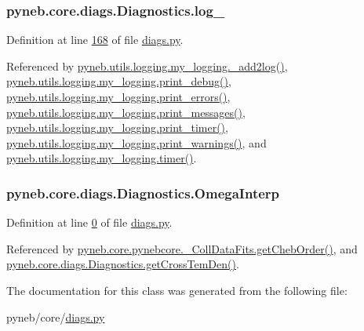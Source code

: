 \hypertarget{classpyneb_1_1core_1_1diags_1_1_diagnostics_a20b70abfa1fd458af2b797e06da01ed0}{}
\subsubsection[{log\+\_\+}]{\setlength{\rightskip}{0pt plus 5cm}pyneb.\+core.\+diags.\+Diagnostics.\+log\+\_\+}\label{classpyneb_1_1core_1_1diags_1_1_diagnostics_a20b70abfa1fd458af2b797e06da01ed0}


Definition at line \hyperlink{diags_8py_source_l00168}{168} of file \hyperlink{diags_8py_source}{diags.\+py}.



Referenced by \hyperlink{logging_8py_source_l00059}{pyneb.\+utils.\+logging.\+my\+\_\+logging.\+\_\+add2log()}, \hyperlink{logging_8py_source_l00157}{pyneb.\+utils.\+logging.\+my\+\_\+logging.\+print\+\_\+debug()}, \hyperlink{logging_8py_source_l00149}{pyneb.\+utils.\+logging.\+my\+\_\+logging.\+print\+\_\+errors()}, \hyperlink{logging_8py_source_l00133}{pyneb.\+utils.\+logging.\+my\+\_\+logging.\+print\+\_\+messages()}, \hyperlink{logging_8py_source_l00165}{pyneb.\+utils.\+logging.\+my\+\_\+logging.\+print\+\_\+timer()}, \hyperlink{logging_8py_source_l00141}{pyneb.\+utils.\+logging.\+my\+\_\+logging.\+print\+\_\+warnings()}, and \hyperlink{logging_8py_source_l00115}{pyneb.\+utils.\+logging.\+my\+\_\+logging.\+timer()}.

\hypertarget{classpyneb_1_1core_1_1diags_1_1_diagnostics_acfd0638b293790832bcee3cd9f3ec342}{}
\subsubsection[{Omega\+Interp}]{\setlength{\rightskip}{0pt plus 5cm}pyneb.\+core.\+diags.\+Diagnostics.\+Omega\+Interp}\label{classpyneb_1_1core_1_1diags_1_1_diagnostics_acfd0638b293790832bcee3cd9f3ec342}


Definition at line \hyperlink{diags_8py_source_l00000}{0} of file \hyperlink{diags_8py_source}{diags.\+py}.



Referenced by \hyperlink{pynebcore_8py_source_l00694}{pyneb.\+core.\+pynebcore.\+\_\+\+Coll\+Data\+Fits.\+get\+Cheb\+Order()}, and \hyperlink{diags_8py_source_l00554}{pyneb.\+core.\+diags.\+Diagnostics.\+get\+Cross\+Tem\+Den()}.



The documentation for this class was generated from the following file\+:\begin{DoxyCompactItemize}
\item 
pyneb/core/\hyperlink{diags_8py}{diags.\+py}\end{DoxyCompactItemize}
